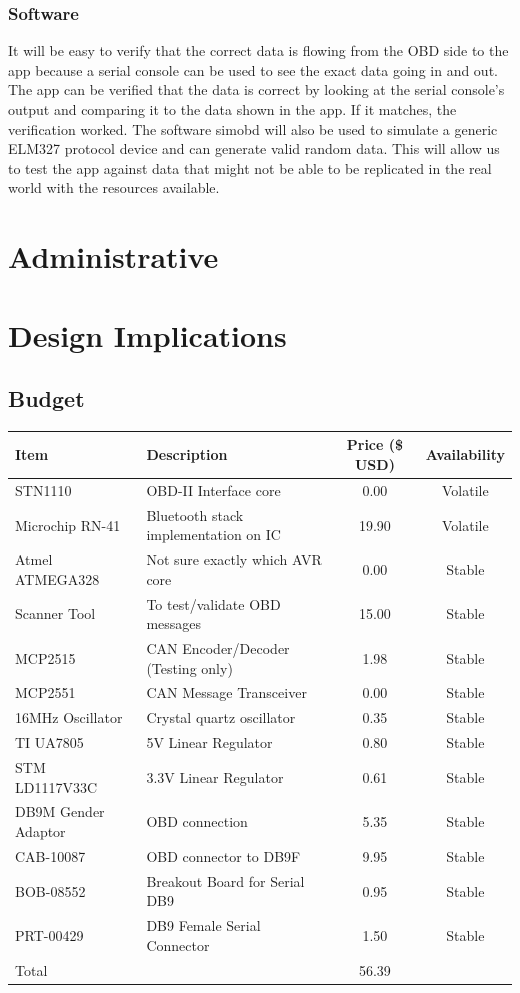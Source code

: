 \documentclass[12pt,letterpaper]{article}
\begin{document}
\subsubsection{Software}
It will be easy to verify that the correct data is flowing from the OBD side to the app because a serial console can be used to see the exact data going in and out. The app can be verified that the data is correct by looking at the serial console's output and comparing it to the data shown in the app. If it matches, the verification worked. The software simobd will also be used to simulate a generic ELM327 protocol device and can generate valid random data. This will allow us to test the app against data that might not be able to be replicated in the real world with the resources available. 

\newpage

\section{Administrative}


\newpage

\section{Design Implications}
\subsection{Budget}
\begin{tabular}{| l | p{7cm} | c | c |}
\hline
Item & Description & Price (\$ USD) & Availability \\ \hline
STN1110 & OBD-II Interface core & 0.00 & Volatile \\ \hline
Microchip RN-41 & Bluetooth stack implementation on IC & 19.90 & Volatile \\ \hline
Atmel ATMEGA328 & Not sure exactly which AVR core & 0.00 & Stable \\ \hline
Scanner Tool & To test/validate OBD messages & 15.00 & Stable\\ \hline
MCP2515 & CAN Encoder/Decoder (Testing only) & 1.98 & Stable\\ \hline
MCP2551 & CAN Message Transceiver & 0.00 & Stable\\ \hline
16MHz Oscillator & Crystal quartz oscillator & 0.35 & Stable \\ \hline
TI UA7805 & 5V Linear Regulator & 0.80 & Stable \\ \hline
STM LD1117V33C & 3.3V Linear Regulator & 0.61 & Stable \\ \hline 
DB9M Gender Adaptor & OBD connection & 5.35 & Stable \\ \hline
CAB-10087 & OBD connector to DB9F & 9.95 & Stable \\ \hline
BOB-08552 & Breakout Board for Serial DB9 & 0.95 & Stable \\ \hline
PRT-00429 & DB9 Female Serial Connector & 1.50 & Stable \\ \hline
\hline
Total && 56.39 & \\ \hline
\end{tabular}
\end{document}
